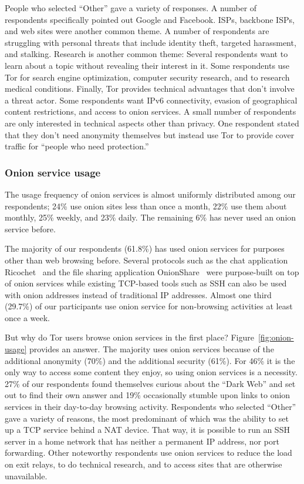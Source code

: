 People who selected ``Other'' gave a variety of responses.  A number of
respondents specifically pointed out Google and Facebook.  ISPs, backbone ISPs,
and web sites were another common theme.  A number of respondents are struggling
with personal threats that include identity theft, targeted harassment, and
stalking.  Research is another common theme: Several respondents want to learn
about a topic without revealing their interest in it.  Some respondents use Tor
for search engine optimization, computer security research, and to research
medical conditions.  Finally, Tor provides technical advantages that don't
involve a threat actor.  Some respondents want IPv6 connectivity, evasion of
geographical content restrictions, and access to onion services.  A small number
of respondents are only interested in technical aspects other than privacy.  One
respondent stated that they don't need anonymity themselves but instead use Tor
to provide cover traffic for ``people who need protection.''

\subsubsection{Onion service usage}

The usage frequency of onion services is almost uniformly distributed among our
respondents; 24\% use onion sites less than once a month, 22\% use them about
monthly, 25\% weekly, and 23\% daily.  The remaining 6\% has never used an onion
service before.

The majority of our respondents (61.8\%) has used onion services for purposes
other than web browsing before.  Several protocols such as the chat application
Ricochet~\cite{ricochet} and the file sharing application
OnionShare~\cite{onionshare} were purpose-built on top of onion services while
existing TCP-based tools such as SSH can also be used with onion addresses
instead of traditional IP addresses.  Almost one third (29.7\%) of our
participants use onion service for non-browsing activities at least once a week.

But why do Tor users browse onion services in the first place?
Figure~\ref{fig:onion-usage} provides an answer.  The majority uses onion
services because of the additional anonymity (70\%) and the additional security
(61\%).  For 46\% it is the only way to access some content they enjoy, so using
onion services is a necessity.  27\% of our respondents found themselves curious
about the ``Dark Web'' and set out to find their own answer and 19\%
occasionally stumble upon links to onion services in their day-to-day browsing
activity.  Respondents who selected ``Other'' gave a variety of reasons, the
most predominant of which was the ability to set up a TCP service behind a NAT
device.  That way, it is possible to run an SSH server in a home network that
has neither a permanent IP address, nor port forwarding.  Other noteworthy
respondents use onion services to reduce the load on exit relays, to do
technical research, and to access sites that are otherwise unavailable.

